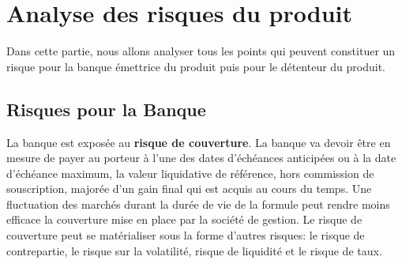 \documentclass[french,12pt,a4paper]{article}
\begin{document}
\newpage
\section{Analyse des risques du produit}

Dans cette partie, nous allons analyser tous les points qui peuvent constituer un risque pour la banque émettrice du produit puis pour le détenteur du produit. \\


\subsection{Risques pour la Banque}


\indent La banque est exposée au \textbf{risque de couverture}. La banque va devoir être en mesure de payer au porteur à l'une des dates d'échéances anticipées ou à la date d'échéance maximum, la valeur liquidative de référence, hors commission de souscription, majorée d'un gain final qui est acquis au cours du temps. Une fluctuation des marchés durant la durée de vie de la formule peut rendre moins efficace la couverture mise en place par la société de gestion. Le risque de couverture peut se matérialiser sous la forme d'autres risques: le risque de contrepartie, le risque sur la volatilité, risque de liquidité et le risque de taux. \\
\end{document}
